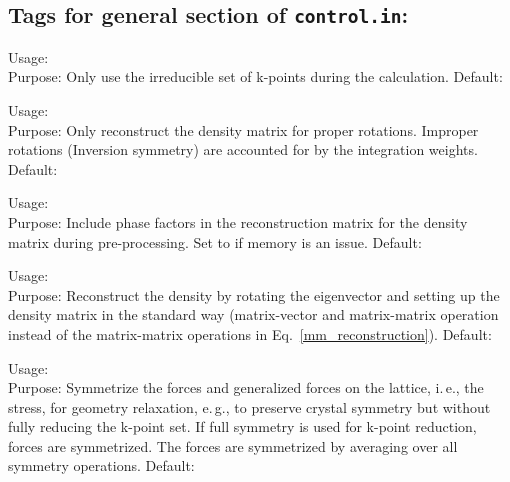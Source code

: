 \subsection*{Tags for general section of \texttt{control.in}:}

{
  \noindent
  Usage:  \\[1.0ex]
  Purpose: Only use the irreducible set of k-points during the calculation. Default: 
  \\[1.0ex]
}

{
  \noindent
  Usage:  \\[1.0ex]
  Purpose: Only reconstruct the density matrix for proper rotations. Improper rotations (Inversion symmetry) are accounted for by the integration weights. Default:  
  \\[1.0ex]
}

{
  \noindent
  Usage:  \\[1.0ex]
  Purpose: Include phase factors in the reconstruction matrix for the density matrix during pre-processing. Set to  if memory is an issue. Default:  
  \\[1.0ex]
}

{
  \noindent
  Usage:  \\[1.0ex]
  Purpose: Reconstruct the density by rotating the eigenvector and setting up the density matrix in the standard way (matrix-vector and matrix-matrix operation instead of the matrix-matrix operations in Eq.~\ref{mm_reconstruction}). Default:  
  \\[1.0ex]
}

{
  \noindent
  Usage:  \\[1.0ex]
  Purpose: Symmetrize the forces and generalized forces on the lattice, i.\,e., 
  the stress, for geometry relaxation, e.\,g., to preserve crystal symmetry but 
  without fully reducing the k-point set. If full symmetry is used for k-point 
  reduction, forces are symmetrized. The forces are symmetrized by averaging 
  over all symmetry operations. Default:  
  \\[1.0ex]
}

